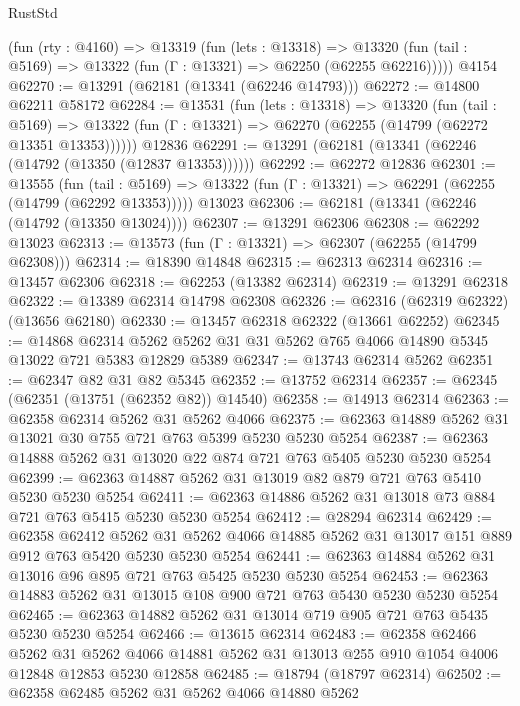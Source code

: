 \begin{lexlean}{RustStd}
\begin{coremodule}
    (fun (rty : @4160) =>
    @13319
      (fun (lets : @13318) =>
      @13320 (fun (tail : @5169) => @13322 (fun (Γ : @13321) => @62250 (@62255 @62216)))))
    @4154
@62270 := @13291 (@62181 (@13341 (@62246 @14793)))
@62272 := @14800 @62211 @58172
@62284 := @13531
    (fun (lets : @13318) =>
    @13320
      (fun (tail : @5169) =>
      @13322 (fun (Γ : @13321) => @62270 (@62255 (@14799 (@62272 @13351 @13353))))))
    @12836
@62291 := @13291 (@62181 (@13341 (@62246 (@14792 (@13350 (@12837 @13353))))))
@62292 := @62272 @12836
@62301 := @13555
    (fun (tail : @5169) => @13322 (fun (Γ : @13321) => @62291 (@62255 (@14799 (@62292 @13353)))))
    @13023
@62306 := @62181 (@13341 (@62246 (@14792 (@13350 @13024))))
@62307 := @13291 @62306
@62308 := @62292 @13023
@62313 := @13573 (fun (Γ : @13321) => @62307 (@62255 (@14799 @62308)))
@62314 := @18390 @14848
@62315 := @62313 @62314
@62316 := @13457 @62306
@62318 := @62253 (@13382 @62314)
@62319 := @13291 @62318
@62322 := @13389 @62314 @14798 @62308
@62326 := @62316 (@62319 @62322) (@13656 @62180)
@62330 := @13457 @62318 @62322 (@13661 @62252)
@62345 := @14868
    @62314
    @5262
    @5262
    @31
    @31
    @5262
    @765
    @4066
    @14890
    @5345
    @13022
    @721
    @5383
    @12829
    @5389
@62347 := @13743 @62314 @5262
@62351 := @62347 @82 @31 @82 @5345
@62352 := @13752 @62314
@62357 := @62345 (@62351 (@13751 (@62352 @82)) @14540)
@62358 := @14913 @62314
@62363 := @62358 @62314 @5262 @31 @5262 @4066
@62375 := @62363 @14889 @5262 @31 @13021 @30 @755 @721 @763 @5399 @5230 @5230 @5254
@62387 := @62363 @14888 @5262 @31 @13020 @22 @874 @721 @763 @5405 @5230 @5230 @5254
@62399 := @62363 @14887 @5262 @31 @13019 @82 @879 @721 @763 @5410 @5230 @5230 @5254
@62411 := @62363 @14886 @5262 @31 @13018 @73 @884 @721 @763 @5415 @5230 @5230 @5254
@62412 := @28294 @62314
@62429 := @62358
    @62412
    @5262
    @31
    @5262
    @4066
    @14885
    @5262
    @31
    @13017
    @151
    @889
    @912
    @763
    @5420
    @5230
    @5230
    @5254
@62441 := @62363 @14884 @5262 @31 @13016 @96 @895 @721 @763 @5425 @5230 @5230 @5254
@62453 := @62363 @14883 @5262 @31 @13015 @108 @900 @721 @763 @5430 @5230 @5230 @5254
@62465 := @62363 @14882 @5262 @31 @13014 @719 @905 @721 @763 @5435 @5230 @5230 @5254
@62466 := @13615 @62314
@62483 := @62358
    @62466
    @5262
    @31
    @5262
    @4066
    @14881
    @5262
    @31
    @13013
    @255
    @910
    @1054
    @4006
    @12848
    @12853
    @5230
    @12858
@62485 := @18794 (@18797 @62314)
@62502 := @62358
    @62485
    @5262
    @31
    @5262
    @4066
    @14880
    @5262

\end{coremodule}
\end{lexlean}
